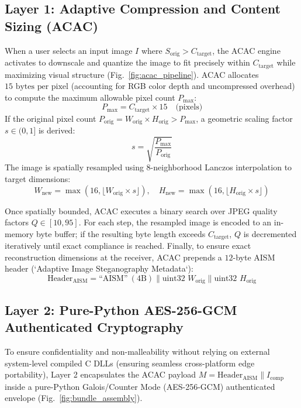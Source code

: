 \documentclass[10pt,conference]{IEEEtran}
\begin{document}
\subsection{Layer 1: Adaptive Compression and Content Sizing (ACAC)}
When a user selects an input image $I$ where $S_{\text{orig}} > C_{\text{target}}$, the ACAC engine activates to downscale and quantize the image to fit precisely within $C_{\text{target}}$ while maximizing visual structure (Fig.~\ref{fig:acac_pipeline}). ACAC allocates $15\text{ bytes per pixel}$ (accounting for RGB color depth and uncompressed overhead) to compute the maximum allowable pixel count $P_{\max}$:
\begin{equation}
P_{\max} = C_{\text{target}} \times 15 \quad \text{(pixels)}
\label{eq:pmax}
\end{equation}
If the original pixel count $P_{\text{orig}} = W_{\text{orig}} \times H_{\text{orig}} > P_{\max}$, a geometric scaling factor $s \in (0, 1]$ is derived:
\begin{equation}
s = \sqrt{\frac{P_{\max}}{P_{\text{orig}}}}
\label{eq:scale}
\end{equation}
The image is spatially resampled using 8-neighborhood Lanczos interpolation to target dimensions:
\begin{equation}
W_{\text{new}} = \max(16, \lfloor W_{\text{orig}} \times s \rfloor), \quad H_{\text{new}} = \max(16, \lfloor H_{\text{orig}} \times s \rfloor)
\label{eq:dims}
\end{equation}

Once spatially bounded, ACAC executes a binary search over JPEG quality factors $Q \in [10, 95]$. For each step, the resampled image is encoded to an in-memory byte buffer; if the resulting byte length exceeds $C_{\text{target}}$, $Q$ is decremented iteratively until exact compliance is reached. Finally, to ensure exact reconstruction dimensions at the receiver, ACAC prepends a $12$-byte AISM header (`Adaptive Image Steganography Metadata`):
\begin{equation}
\text{Header}_{\text{AISM}} = \text{``AISM''} \ (4\text{B}) \parallel \text{uint32 } W_{\text{orig}} \parallel \text{uint32 } H_{\text{orig}}
\label{eq:aism}
\end{equation}

\subsection{Layer 2: Pure-Python AES-256-GCM Authenticated Cryptography}
To ensure confidentiality and non-malleability without relying on external system-level compiled C DLLs (ensuring seamless cross-platform edge portability), Layer 2 encapsulates the ACAC payload $M = \text{Header}_{\text{AISM}} \parallel I_{\text{comp}}$ inside a pure-Python Galois/Counter Mode (AES-256-GCM) authenticated envelope (Fig.~\ref{fig:bundle_assembly}).
\end{document}
